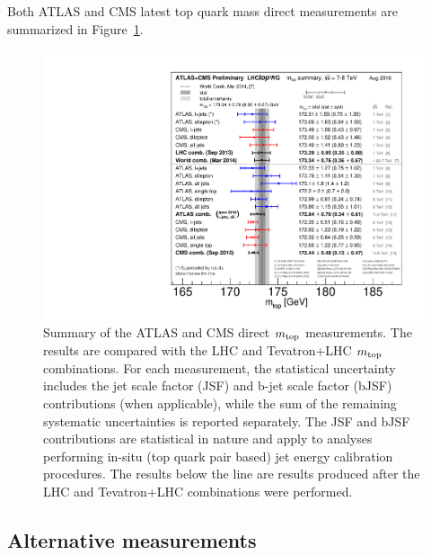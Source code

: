 \documentclass{blois}
\begin{document}
Both ATLAS and CMS latest top quark mass direct measurements are summarized
in Figure~\ref{fig:directTopMass}.
%
\begin{figure}
\centerline{\includegraphics[width=0.9\linewidth]{figures/LHC_topmass_aug2016}}
\caption[]{Summary of the ATLAS and CMS direct $m_{\rm top}$ measurements. The
results are compared with the LHC and Tevatron+LHC $m_{\rm top}$ combinations.
For each measurement, the statistical uncertainty includes the jet scale factor
(JSF) and b-jet scale factor (bJSF) contributions (when applicable), while the
sum of the remaining systematic uncertainties is reported separately. The JSF
and bJSF contributions are statistical in nature and apply to analyses performing
in-situ (top quark pair based) jet energy calibration procedures. The results
below the line are results produced after the LHC and Tevatron+LHC combinations
were performed.}
\label{fig:directTopMass}
\end{figure}

\subsection{Alternative measurements}
\end{document}
